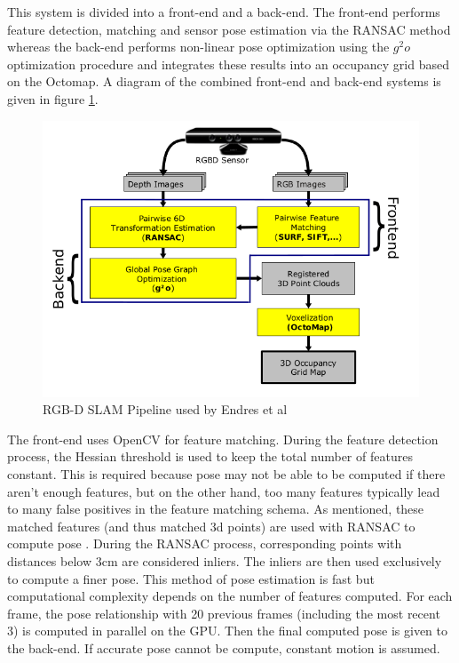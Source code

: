 This system is divided into a front-end and a back-end. The front-end performs feature detection, matching and sensor pose estimation via the RANSAC method whereas the back-end performs non-linear pose optimization using the $g^2o$ optimization procedure   and integrates these results into an occupancy grid based on the Octomap. A diagram of the combined front-end and back-end systems is given in figure \ref{Endres12EvaluationPipeline}. 


\begin{figure}[!h]
\centering
\includegraphics[width=12cm]{images/ch1/Endres12EvaluationPipeline}
\caption{RGB-D SLAM Pipeline used by Endres et al \cite{Endres12Evaluation}}
\label{Endres12EvaluationPipeline}
\end{figure}


The front-end uses OpenCV \cite{Bradski08Learning} for feature matching. During the feature detection process, the Hessian threshold is used to keep the total number of features constant. This is required because pose may not be able to be computed if there aren't enough features, but on the other hand, too many features typically lead to many false positives in the feature matching schema. As mentioned, these matched features (and thus matched 3d points) are used with RANSAC to compute pose \cite{Umeyama91Least}. During the RANSAC process, corresponding points with distances below 3cm are considered inliers. The inliers are then used exclusively to compute a finer pose. This method of pose estimation is fast but computational complexity depends on the number of features computed. For each frame, the pose relationship with 20 previous frames (including the most recent 3) is computed in parallel on the GPU. Then the final computed pose is given to the back-end. If accurate pose cannot be compute, constant motion is assumed. \\

